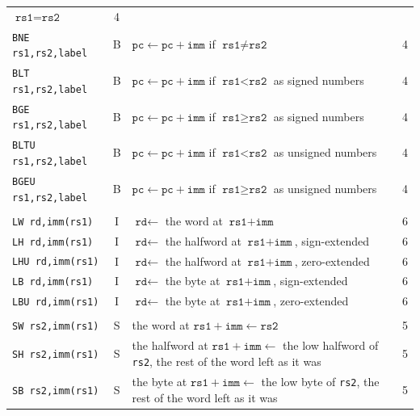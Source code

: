 \documentclass[11pt,a4paper]{report}
\begin{document}
\begin{footnotesize}
\begin{longtable}{@{}>{\raggedright\arraybackslash}p{3.3cm}c
    >{\raggedright\arraybackslash}p{8.4cm}c@{}}
    $\texttt{rs1} = \texttt{rs2}$ & 4 \\
  \texttt{BNE rs1,rs2,label} & B & $\texttt{pc} \leftarrow \texttt{pc} + \texttt{imm}$ if
    $\texttt{rs1} \ne \texttt{rs2}$ & 4 \\
  \texttt{BLT rs1,rs2,label} & B & $\texttt{pc} \leftarrow \texttt{pc} + \texttt{imm}$ if
    $\texttt{rs1} < \texttt{rs2}$ as signed numbers & 4 \\
  \texttt{BGE rs1,rs2,label} & B & $\texttt{pc} \leftarrow \texttt{pc} + \texttt{imm}$ if
    $\texttt{rs1} \ge \texttt{rs2}$ as signed numbers & 4 \\
  \texttt{BLTU rs1,rs2,label} & B & $\texttt{pc} \leftarrow \texttt{pc} + \texttt{imm}$ if
    $\texttt{rs1} < \texttt{rs2}$ as unsigned numbers & 4 \\
  \texttt{BGEU rs1,rs2,label} & B & $\texttt{pc} \leftarrow \texttt{pc} + \texttt{imm}$ if
    $\texttt{rs1} \ge \texttt{rs2}$ as unsigned numbers & 4 \\
  \midrule
  \multicolumn{4}{@{}l}{\emph{Loads}} \\*
  \texttt{LW rd,imm(rs1)} & I & $\texttt{rd} \leftarrow$ the word at
    $\texttt{rs1} + \texttt{imm}$ & 6 \\
  \texttt{LH rd,imm(rs1)} & I & $\texttt{rd} \leftarrow$ the halfword at
    $\texttt{rs1} + \texttt{imm}$, sign-extended & 6 \\
  \texttt{LHU rd,imm(rs1)} & I & $\texttt{rd} \leftarrow$ the halfword at
    $\texttt{rs1} + \texttt{imm}$, zero-extended & 6 \\
  \texttt{LB rd,imm(rs1)} & I & $\texttt{rd} \leftarrow$ the byte at
    $\texttt{rs1} + \texttt{imm}$, sign-extended & 6 \\
  \texttt{LBU rd,imm(rs1)} & I & $\texttt{rd} \leftarrow$ the byte at
    $\texttt{rs1} + \texttt{imm}$, zero-extended & 6 \\
  \midrule
  \multicolumn{4}{@{}l}{\emph{Stores}} \\*
  \texttt{SW rs2,imm(rs1)} & S & the word at $\texttt{rs1} + \texttt{imm} \leftarrow
    \texttt{rs2}$ & 5 \\
  \texttt{SH rs2,imm(rs1)} & S & the halfword at $\texttt{rs1} + \texttt{imm} \leftarrow$
    the low halfword of \texttt{rs2}, the rest of the word left as it was & 5 \\
  \texttt{SB rs2,imm(rs1)} & S & the byte at $\texttt{rs1} + \texttt{imm} \leftarrow$ the
    low byte of \texttt{rs2}, the rest of the word left as it was & 5 \\
  \midrule

\end{longtable}
\end{footnotesize}
\end{document}
